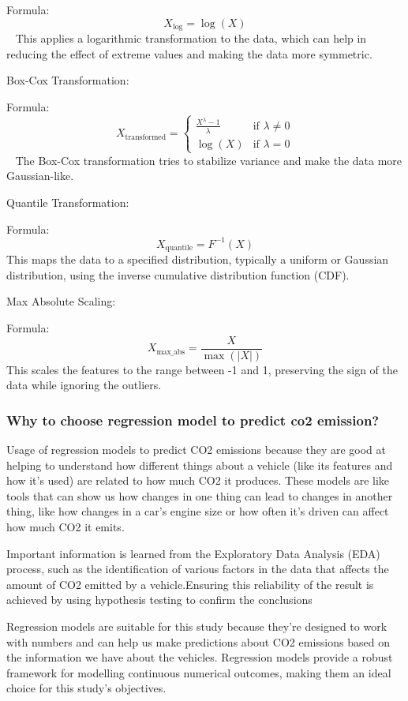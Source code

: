 \documentclass[12pt, a4paper,oneside]{book}
\numberwithin{equation}{section}
\begin{document}
Formula:
\[
X_{\text{log}} = \log(X)
\]~\cite{ref11}
This applies a logarithmic transformation to the data, which can help in reducing the effect of extreme values and making the data more symmetric.~\cite{ref11}

\hfill\break
Box-Cox Transformation:

Formula:
\[
X_{\text{transformed}} =
\begin{cases}
\frac{X^\lambda - 1}{\lambda} & \text{if } \lambda \neq 0 \\
\log(X) & \text{if } \lambda = 0
\end{cases}
\]~\cite{ref11}
The Box-Cox transformation tries to stabilize variance and make the data more Gaussian-like.

Quantile Transformation:

Formula:
\[
X_{\text{quantile}} = F^{-1}(X)
\]
This maps the data to a specified distribution, typically a uniform or Gaussian distribution, using the inverse cumulative distribution function (CDF).

Max Absolute Scaling:

Formula:
\[
X_{\text{max\_abs}} = \frac{X}{\max(|X|)}
\]
 This scales the features to the range between -1 and 1, preserving the sign of the data while ignoring the outliers.


\subsubsection{Why to choose regression model to predict co2 emission?}

Usage of regression models to predict CO2 emissions because they are good at helping to understand how different things about a vehicle (like its features and how it's used) are related to how much CO2 it produces. These models are like tools that can show us how changes in one thing can lead to changes in another thing, like how changes in a car's engine size or how often it's driven can affect how much CO2 it emits.

Important information is learned from the Exploratory Data Analysis (EDA) process, such as the identification of various factors in the data that affects the amount of CO2 emitted by a vehicle.Ensuring this reliability of the result is achieved by using hypothesis testing to confirm the conclusions

Regression models are suitable for this study because they're designed to work with numbers and can help us make predictions about CO2 emissions based on the information we have about the vehicles. Regression models provide a robust framework for modelling continuous numerical outcomes, making them an ideal choice for this study's objectives.
\end{document}
